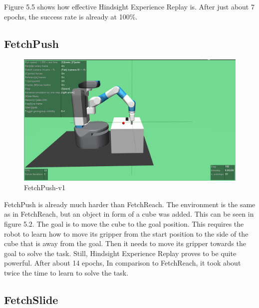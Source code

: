 \vspace{0.5cm}

Figure 5.5 shows how effective Hindsight Experience Replay is.  After just about 7 epochs, the success rate is already at 100\%.




\subsection{FetchPush}

\begin{figure} [h]
	
	\centering
	\includegraphics[width=1\textwidth]{figures/FetchPush-v1.png}
	\caption{FetchPush-v1}
	
\end{figure}

FetchPush is already much harder than FetchReach. The environment is the same as in FetchReach, but an object in form of a cube was added. This can be seen in figure 5.2. The goal is to move the cube to the goal position. This requires the robot to learn how to move its gripper from the start position to the side of the cube that is away from the goal. Then it needs to move its gripper towards the goal to solve the task. Still, Hindsight Experience Replay proves to be quite powerful. After about 14 epochs, In comparison to FetchReach, it took about twice the time to learn to solve the task.





\subsection{FetchSlide}

